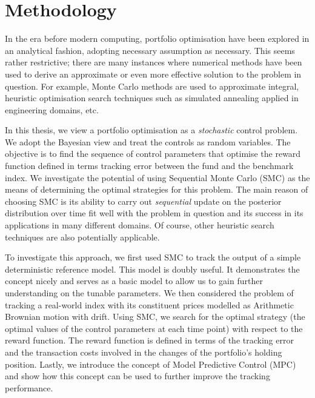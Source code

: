 \section{Methodology}
In the era before modern computing, portfolio optimisation have been explored in an analytical fashion, adopting necessary assumption as necessary. This seems rather restrictive; there are many instances where numerical methods have been used to derive an approximate or even more effective solution to the problem in question. For example, Monte Carlo methods are used to approximate integral, heuristic optimisation search techniques such as simulated annealing applied in engineering domains, etc.

In this thesis, we view a portfolio optimisation as a \emph{stochastic} control problem. We adopt the Bayesian view and treat the controls as random variables. The objective is to find the sequence of control parameters that optimise the reward function defined in terms tracking error between the fund and the benchmark index. We investigate the potential of using Sequential Monte Carlo (SMC) as the means of determining the optimal strategies for this problem. The main reason of choosing SMC is its ability to carry out \emph{sequential} update on the posterior distribution over time fit well with the problem in question and its success in its applications in many different domains. Of course, other heuristic search techniques are also potentially applicable.

To investigate this approach, we first used SMC to track the output of a simple deterministic reference model. This model is doubly useful. It demonstrates the concept nicely and serves as a basic model to allow us to gain further understanding on the tunable parameters. We then considered the problem of tracking a real-world index with its constituent prices modelled as Arithmetic Brownian motion with drift. Using SMC, we search for the optimal strategy (the optimal values of the control parameters at each time point) with respect to the reward function. The reward function is defined in terms of the tracking error and the transaction costs involved in the changes of the portfolio's holding position. Lastly, we introduce the concept of Model Predictive Control (MPC) and show how this concept can be used to further improve the tracking performance.

